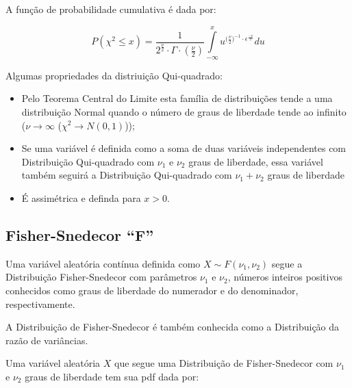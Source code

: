 \documentclass[
]{book}
\providecommand{\tightlist}{%
  \setlength{\itemsep}{0pt}\setlength{\parskip}{0pt}}
\begin{document}
\hfill\break

A função de probabilidade cumulativa é dada por:

\hfill\break

\[
P(\chi^{2} \le x) = \frac{1}{{2}^{\frac{\nu}{2}} \cdot \Gamma \cdot  (\frac{\nu}{2})} \underset{-\infty }{\overset{x}{\int }} {u}^{ {(\frac{\nu}{2}})^{-1} \cdot \epsilon ^{\frac{-\nu}{2}} }du
\]

\hfill\break

Algumas propriedades da distriuição Qui-quadrado:

\hfill\break

\begin{itemize}
\tightlist
\item
  Pelo Teorema Central do Limite esta família de distribuições tende a uma distribuição Normal quando o número de graus de liberdade tende ao infinito (\(\nu \to \infty\) (\(\chi^{2} \to N(0,1)\)));\\
\item
  Se uma variável é definida como a soma de duas variáveis independentes com Distribuição Qui-quadrado com \(\nu_{1}\) e \(\nu_{2}\) graus de liberdade, essa variável também seguirá a Distribuição Qui-quadrado com \(\nu_{1} + \nu_{2}\) graus de liberdade
\item
  É assimétrica e definda para \(x > 0\).
\end{itemize}

\hfill\break

\hypertarget{fisher-snedecor-f}{%
\subsection{Fisher-Snedecor ``F''}\label{fisher-snedecor-f}}

\hfill\break

Uma variável aleatória contínua definida como \(X \sim F(\nu_{1},\nu_{2})\) segue a Distribuição Fisher-Snedecor com parâmetros \(\nu_{1}\) e \(\nu_{2}\), números inteiros positivos conhecidos como graus de liberdade do numerador e do denominador, respectivamente.

\hfill\break

A Distribuição de Fisher-Snedecor é também conhecida como a Distribuição da razão de variâncias.

\hfill\break

Uma variável aleatória \(X\) que segue uma Distribuição de Fisher-Snedecor com \(\nu_{1}\) e \(\nu_{2}\) graus de liberdade tem sua pdf dada por:
\end{document}
